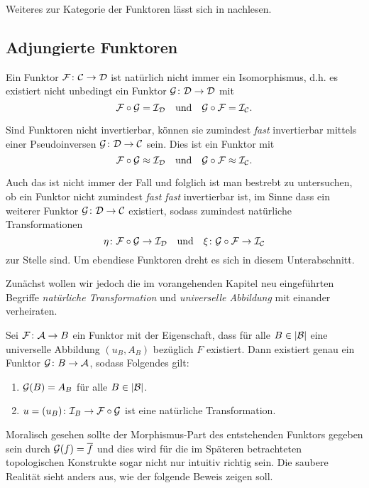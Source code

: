 Weiteres zur Kategorie der Funktoren lässt sich in \cite{brandenburg2016einfhrung} nachlesen.

\subsection{Adjungierte Funktoren}

Ein Funktor $\mathcal{F} \colon \mathcal{C} \to \mathcal{D}$ ist natürlich nicht immer ein Isomorphismus, d.h. es existiert nicht unbedingt ein Funktor $\mathcal{G} \colon \mathcal{D} \to \mathcal{D}$ mit
$$
\mathcal{F} \circ \mathcal{G} = \mathcal{I}_{\mathcal{D}} \quad\text{und}\quad \mathcal{G} \circ \mathcal{F} = \mathcal{I}_{\mathcal{C}}.
$$

Sind Funktoren nicht invertierbar, können sie zumindest \emph{fast} invertierbar mittels einer Pseudoinversen $\mathcal{G} \colon \mathcal{D} \to \mathcal{C}$ sein.
Dies ist ein Funktor mit 
$$\mathcal{F} \circ \mathcal{G} \approx \mathcal{I}_{\mathcal{D}} \quad\text{und}\quad \mathcal{G} \circ \mathcal{F} \approx \mathcal{I}_{\mathcal{C}}.$$

Auch das ist nicht immer der Fall und folglich ist man bestrebt zu untersuchen, ob ein Funktor nicht zumindest \emph{fast fast} invertierbar ist, im Sinne dass ein weiterer Funktor $\mathcal{G} \colon \mathcal{D} \to \mathcal{C}$ existiert, sodass zumindest natürliche Transformationen
$$
\eta \colon \mathcal{F} \circ \mathcal{G} \to \mathcal{I}_{\mathcal{D}} \quad\text{und}\quad \xi \colon \mathcal{G} \circ \mathcal{F} \to \mathcal{I}_{\mathcal{C}}
$$
zur Stelle sind.
Um ebendiese Funktoren dreht es sich in diesem Unterabschnitt.

Zunächst wollen wir jedoch die im vorangehenden Kapitel neu eingeführten Begriffe \emph{natürliche Transformation} und \emph{universelle Abbildung} mit einander verheiraten.

\begin{thm}
  Sei $\mathcal{F} \colon \mathcal{A} \to B$ ein Funktor mit der Eigenschaft, dass für alle $B \in |\mathcal{B}|$ eine universelle Abbildung $(u_B, A_B)$ bezüglich $F$ existiert.
  Dann existiert genau ein Funktor $\mathcal{G} \colon B \to \mathcal{A}$, sodass Folgendes gilt:
  \begin{enumerate}[(1)]
    \item $\mathcal{G}(B) = A_B$ für alle $B \in |\mathcal{B}|$.
    \item $u = (u_B) \colon \mathcal{I}_B \to \mathcal{F} \circ \mathcal{G}$ ist eine natürliche Transformation.
  \end{enumerate}
\end{thm}

Moralisch gesehen sollte der Morphismus-Part des entstehenden Funktors gegeben sein durch $\mathcal{G}(f) = \overline f$ und dies wird für die im Späteren betrachteten topologischen Konstrukte sogar nicht nur intuitiv richtig sein. 
Die saubere Realität sieht anders aus, wie der folgende Beweis zeigen soll.

